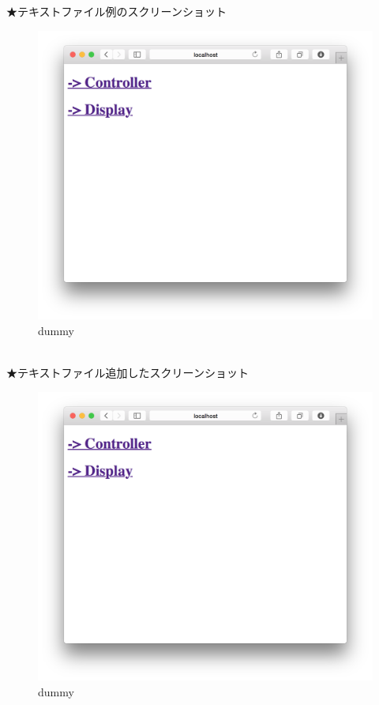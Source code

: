 \documentclass[a4paper,10pt,oneside]{jsbook}
\begin{document}
★テキストファイル例のスクリーンショット
\begin{figure}[htbp]
	\begin{center}
		\includegraphics[width=11.5cm]{image/home.png}
	\end{center}
	\caption{dummy}
	\label{fig:home}
\end{figure}
\\
★テキストファイル追加したスクリーンショット
\begin{figure}[htbp]
	\begin{center}
		\includegraphics[width=11.5cm]{image/home.png}
	\end{center}
	\caption{dummy}
	\label{fig:home}
\end{figure}
\\
\end{document}
